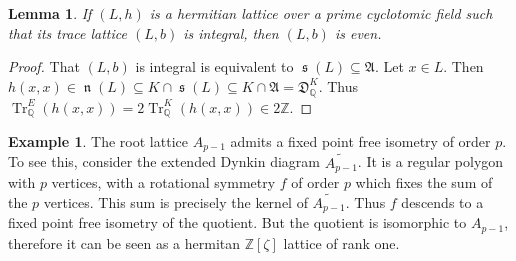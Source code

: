 \documentclass{amsart}
\theoremstyle{definition}
\newtheorem{example}[definition]{Example}
\theoremstyle{plain}
\newtheorem{lemma}[definition]{Lemma}
\DeclareMathOperator{\Tr}{Tr}
\DeclareMathOperator{\scale}{\mathfrak{s}}
\DeclareMathOperator{\norm}{\mathfrak{n}}
\newcommand{\QQ}{\mathbb{Q}}
\newcommand{\ZZ}{\mathbb{Z}}
\begin{document}
\begin{lemma}\label{lem:even}
 If $(L,h)$ is a hermitian lattice over a prime cyclotomic field such that its trace lattice $(L,b)$ is integral, then $(L,b)$ is even.
\end{lemma}
\begin{proof}
 That $(L,b)$ is integral is equivalent to $\scale(L) \subseteq \mathfrak{A}$. Let $x\in L$. Then $h(x,x) \in \norm(L) \subseteq K \cap \scale(L) \subseteq K \cap \mathfrak{A} = \mathfrak{D}^K_\QQ$. Thus $\Tr^E_\QQ(h(x,x))=2\Tr^K_\QQ(h(x,x)) \in 2\ZZ$.
\end{proof}

\begin{example}
 The root lattice $A_{p-1}$ admits a fixed point free isometry of order $p$. To see this, consider the extended Dynkin diagram $\widetilde{A_{p-1}}$. It is a regular polygon with $p$ vertices, with a rotational symmetry $f$ of order $p$ which fixes the sum of the $p$ vertices. This sum is precisely the kernel of $\widetilde{A_{p-1}}$. Thus $f$ descends to a fixed point free isometry of the quotient. But the quotient is isomorphic to $A_{p-1}$, therefore it can be seen as a hermitan $\ZZ[\zeta]$ lattice of rank one.
\end{example}
\end{document}
